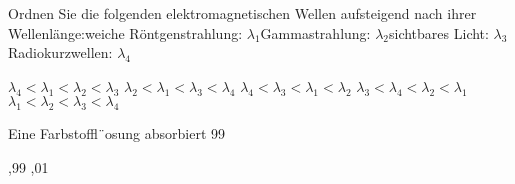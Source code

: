 \documentclass[11pt]{exam}
\begin{document}
\begin{questions}
\vspace{3mm}\question Ordnen Sie die folgenden elektromagnetischen Wellen aufsteigend nach ihrer Wellenlänge:weiche Röntgenstrahlung: \( \lambda_1 \)Gammastrahlung: \( \lambda_2 \)sichtbares Licht: \( \lambda_3 \)Radiokurzwellen: \( \lambda_4 \)

\begin{choices}
	\choice \( \lambda_4 < \lambda_1 < \lambda_2 < \lambda_3 \)
	\choice \( \lambda_2 < \lambda_1 < \lambda_3 < \lambda_4 \)
	\choice \( \lambda_4 < \lambda_3 < \lambda_1 < \lambda_2 \)
	\choice \( \lambda_3 < \lambda_4 < \lambda_2 < \lambda_1 \)
	\choice \( \lambda_1 < \lambda_2 < \lambda_3 < \lambda_4 \)
\end{choices}

\vspace{3mm}\question Eine Farbstoffl¨osung absorbiert 99 %

\begin{choices}
	,99
	,01
\end{choices}

\vspace{3mm}\end{questions}
\end{document}
